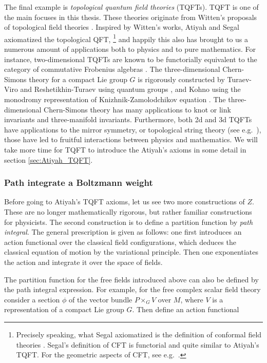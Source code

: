 The final example is \emph{topological quantum field theories} (TQFTs).
TQFT is one of the main focuses in this thesis. These theories
originate from Witten's proposals of topological field theories
\cite{Witten:1988xj, Witten:1988ze, Witten:1988hf}. Inspired by Witten's
works, Atiyah and Segal axiomatized the topological QFT,%
%
\footnote{Precisely speaking, what Segal axiomatized is the definition of conformal
field theories \cite{Segal:2002ei}. Segal's definition of CFT is functorial
and quite similar to Atiyah's TQFT.
For the geometric aspects of CFT, see e.g.~\cite{Friedan:1986ua}. }
%
and happily this also has brought to us a numerous amount of applications
both to physics and to pure mathematics. For instance, two-dimensional
TQFTs are known to be functorially equivalent to the category of commutative
Frobenius algebras \cite{MR2037238}. The three-dimensional Chern-Simons theory for a
compact Lie group $G$ is rigorously constructed by
Turaev-Viro and Reshetikhin-Turaev using quantum groups \cite{Turaev:1992hq, Reshetikhin:1991tc},
and Kohno \cite{MR1167165} using
the monodromy representation of Knizhnik-Zamolodchikov equation \cite{Knizhnik:1984nr}.
The three-dimensional Chern-Simons theory has many
applications to knot or link invariants and three-manifold invariants.
Furthermore, both 2d and 3d TQFTs have applications to the mirror symmetry,
or topological string theory (see e.g.~\cite{Hori:2003ic}), those have led to fruitful interactions
between physics and mathematics. We will take more time for TQFT to
introduce the Atiyah's axioms in some detail in section \ref{sec:Atiyah_TQFT}.





\subsubsection*{Path integrate a Boltzmann weight}

Before going to Atiyah's TQFT axioms, let us see two more constructions
of $Z$. These are no longer mathematically rigorous, but rather familiar
constructions for physicists. The second construction is to define
a partition function by \emph{path integral}. The general prescription
is given as follows: one first introduces an action functional over
the classical field configurations, which deduces the classical equation
of motion by the variational principle. Then one exponentiates the
action and integrate it over the space of fields.

The partition function for the free fields introduced above can also be
defined by the path integral expression. For example, for the free
complex scalar field theory consider a section $\phi$ of the vector
bundle $P\times_{G}V$ over $M$, where $V$ is a representation of
a compact Lie group $G$. Then define an action functional

